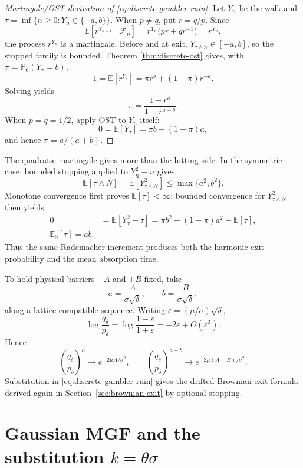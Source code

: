 \documentclass[10pt,a4paper]{article}
\numberwithin{equation}{section}
\theoremstyle{blueplain}
\theoremstyle{definition}
\newcommand{\E}{\mathbb E}
\newcommand{\Pp}{\mathbb P}
\newcommand{\F}{\mathcal F}
\begin{document}
\begin{proof}[Martingale/OST derivation of \eqref{eq:discrete-gambler-ruin}]
Let \(Y_n\) be the walk and
\(\tau=\inf\{n\ge0:Y_n\in\{-a,b\}\}\).  When \(p\ne q\), put \(r=q/p\).
Since
\[
  \E[r^{Y_{n+1}}\mid\F_n]
  =r^{Y_n}\bigl(pr+qr^{-1}\bigr)
  =r^{Y_n},
\]
the process \(r^{Y_n}\) is a martingale.  Before and at exit,
\(Y_{\tau\wedge n}\in[-a,b]\), so the stopped family is bounded.  Theorem
\ref{thm:discrete-ost} gives, with
\(\pi=\Pp_0(Y_\tau=b)\),
\[
  1=\E[r^{Y_\tau}]
   =\pi r^b+(1-\pi)r^{-a}.
\]
Solving yields
\[
  \pi=\frac{1-r^a}{1-r^{a+b}}.
\]
When \(p=q=1/2\), apply OST to \(Y_n\) itself:
\[
  0=\E[Y_\tau]=\pi b-(1-\pi)a,
\]
and hence \(\pi=a/(a+b)\).
\end{proof}

The quadratic martingale gives more than the hitting side.  In the symmetric
case, bounded stopping applied to \(Y_n^2-n\) gives
\[
  \E[\tau\wedge N]
  =\E[Y_{\tau\wedge N}^2]
  \le\max\{a^2,b^2\}.
\]
Monotone convergence first proves \(\E[\tau]<\infty\); bounded convergence for
\(Y_{\tau\wedge N}^2\) then yields
\begin{align}
  0
  &=\E[Y_\tau^2-\tau]
   =\pi b^2+(1-\pi)a^2-\E[\tau],\\
  \boxed{\E_0[\tau]=ab.}
  \label{eq:fair-ruin-duration}
\end{align}
Thus the same Rademacher increment produces both the harmonic exit probability
and the mean absorption time.

To hold physical barriers \(-A\) and \(+B\) fixed, take
\[
  a=\frac{A}{\sigma\sqrt\delta},
  \qquad
  b=\frac{B}{\sigma\sqrt\delta},
\]
along a lattice-compatible sequence.  Writing
\(\varepsilon=(\mu/\sigma)\sqrt\delta\),
\begin{equation}
  \log\frac{q_\delta}{p_\delta}
  =\log\frac{1-\varepsilon}{1+\varepsilon}
  =-2\varepsilon+O(\varepsilon^3).
  \label{eq:ratio-expansion}
\end{equation}
Hence
\begin{equation}
  \left(\frac{q_\delta}{p_\delta}\right)^a
  \longrightarrow e^{-2\mu A/\sigma^2},
  \qquad
  \left(\frac{q_\delta}{p_\delta}\right)^{a+b}
  \longrightarrow e^{-2\mu(A+B)/\sigma^2}.
  \label{eq:ratio-power-limit}
\end{equation}
Substitution in \eqref{eq:discrete-gambler-ruin} gives the drifted Brownian
exit formula derived again in Section~\ref{sec:brownian-exit} by optional
stopping.

\section{Gaussian MGF and the substitution \texorpdfstring{$k=\theta\sigma$}{k = theta sigma}}
\end{document}

